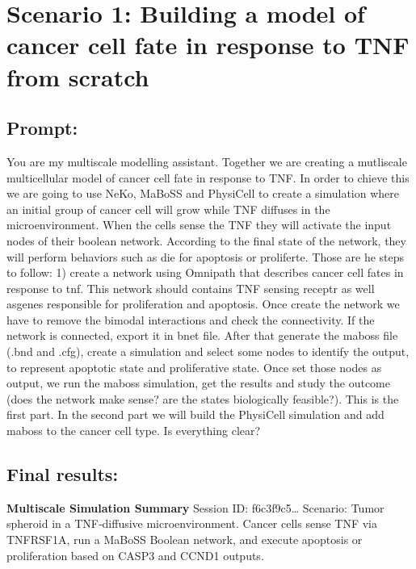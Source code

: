 \hypertarget{scenario-1-building-a-model-of-cancer-cell-fate-in-response-to-tnf-from-scratch}{%
\section{Scenario 1: Building a model of cancer cell fate in response to
TNF from
scratch}\label{scenario-1-building-a-model-of-cancer-cell-fate-in-response-to-tnf-from-scratch}}

\hypertarget{prompt}{%
\subsection{Prompt:}\label{prompt}}

You are my multiscale modelling assistant. Together we are creating a
mutliscale multicellular model of cancer cell fate in response to TNF.
In order to chieve this we are going to use NeKo, MaBoSS and PhysiCell
to create a simulation where an initial group of cancer cell will grow
while TNF diffuses in the microenvironment. When the cells sense the TNF
they will activate the input nodes of their boolean network. According
to the final state of the network, they will perform behaviors such as
die for apoptosis or proliferte. Those are he steps to follow: 1) create
a network using Omnipath that describes cancer cell fates in response to
tnf. This network should contains TNF sensing receptr as well asgenes
responsible for proliferation and apoptosis. Once create the network we
have to remove the bimodal interactions and check the connectivity. If
the network is connected, export it in bnet file. After that generate
the maboss file (.bnd and .cfg), create a simulation and select some
nodes to identify the output, to represent apoptotic state and
proliferative state. Once set those nodes as output, we run the maboss
simulation, get the results and study the outcome (does the network make
sense? are the states biologically feasible?). This is the first part.
In the second part we will build the PhysiCell simulation and add maboss
to the cancer cell type. Is everything clear?

\hypertarget{final-results}{%
\subsection{Final results:}\label{final-results}}

\textbf{Multiscale Simulation Summary} Session ID: f6c3f9c5\ldots{}
Scenario: Tumor spheroid in a TNF‐diffusive microenvironment. Cancer
cells sense TNF via TNFRSF1A, run a MaBoSS Boolean network, and execute
apoptosis or proliferation based on CASP3 and CCND1 outputs.

